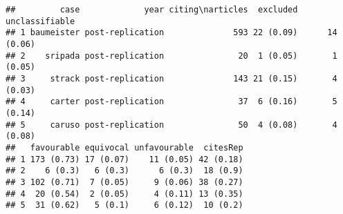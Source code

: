 \documentclass[
  american,
  ,man,floatsintext]{apa6}
\begin{document}
\begin{appendix}
\begin{verbatim}
##         case             year citing\narticles  excluded unclassifiable
## 1 baumeister post-replication              593 22 (0.09)      14 (0.06)
## 2    sripada post-replication               20  1 (0.05)       1 (0.05)
## 3     strack post-replication              143 21 (0.15)       4 (0.03)
## 4     carter post-replication               37  6 (0.16)       5 (0.14)
## 5     caruso post-replication               50  4 (0.08)       4 (0.08)
##   favourable equivocal unfavourable  citesRep
## 1 173 (0.73) 17 (0.07)    11 (0.05) 42 (0.18)
## 2    6 (0.3)   6 (0.3)      6 (0.3)  18 (0.9)
## 3 102 (0.71)  7 (0.05)     9 (0.06) 38 (0.27)
## 4  20 (0.54)  2 (0.05)     4 (0.11) 13 (0.35)
## 5  31 (0.62)   5 (0.1)     6 (0.12)  10 (0.2)
\end{verbatim}
\end{appendix}
\end{document}
